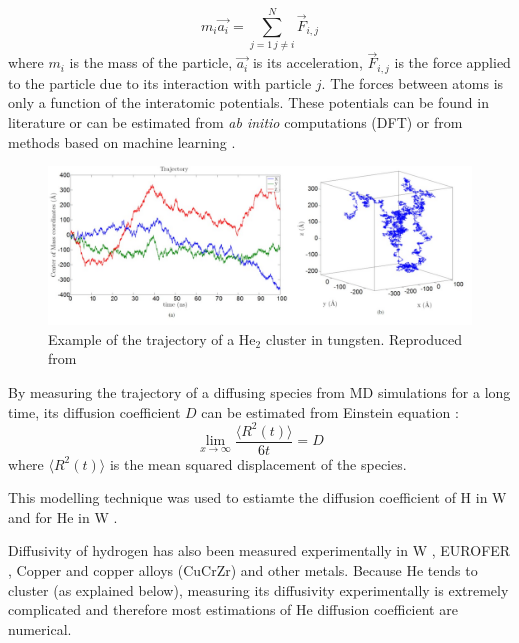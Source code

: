 \begin{equation}
    m_i \vec{a_i} = \sum_{j=1 \, j \neq i}^N \vec{F}_{i,j}
\end{equation}
where $m_i$ is the mass of the particle, $\vec{a_i}$ is its acceleration, $\vec{F}_{i,j}$ is the force applied to the particle due to its interaction with particle $j$.
The forces between atoms is only a function of the interatomic potentials.
These potentials can be found in literature or can be estimated from \textit{ab initio} computations (DFT)  or from methods based on machine learning .

\begin{figure}
    \centering
    \includegraphics[width=\linewidth]{Figures/Chapter1/faney_md.jpg}
    \caption{Example of the trajectory of a He$_2$ cluster in tungsten. Reproduced from \cite{faney_numerical_2013}}
    \label{fig: md faney}
\end{figure}

By measuring the trajectory of a diffusing species from MD simulations for a long time, its diffusion coefficient $D$ can be estimated from Einstein equation \cite{einstein_uber_1905}:
\begin{equation}
    \lim_{x\to\infty} \frac{\langle R^2(t) \rangle}{6t} = D
\end{equation}
where $\langle R^2(t) \rangle$ is the mean squared displacement of the species.

This modelling technique was used to estiamte the diffusion coefficient of H in W  and for He in W .

Diffusivity of hydrogen has also been measured experimentally in W , EUROFER , Copper and copper alloys (CuCrZr)  and other metals.
Because He tends to cluster (as explained below), measuring its diffusivity experimentally is extremely complicated and therefore most estimations of He diffusion coefficient are numerical.

